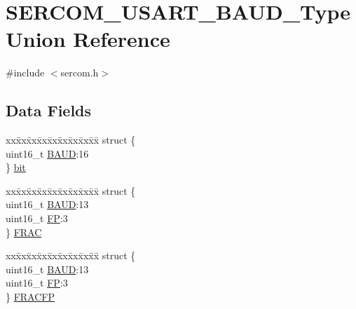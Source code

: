 \hypertarget{union_s_e_r_c_o_m___u_s_a_r_t___b_a_u_d___type}{}\section{S\+E\+R\+C\+O\+M\+\_\+\+U\+S\+A\+R\+T\+\_\+\+B\+A\+U\+D\+\_\+\+Type Union Reference}
\label{union_s_e_r_c_o_m___u_s_a_r_t___b_a_u_d___type}


{\ttfamily \#include $<$sercom.\+h$>$}

\subsection*{Data Fields}
\begin{DoxyCompactItemize}
\item 
\begin{tabbing}
xx\=xx\=xx\=xx\=xx\=xx\=xx\=xx\=xx\=\kill
struct \{\\
\>uint16\_t \mbox{\hyperlink{union_s_e_r_c_o_m___u_s_a_r_t___b_a_u_d___type_a4e98caf098e8b0e2afbb35aa81e03f6a}{BAUD}}:16\\
\} \mbox{\hyperlink{union_s_e_r_c_o_m___u_s_a_r_t___b_a_u_d___type_a70d99152e7a87b212ff5f67996ab0d4c}{bit}}\\

\end{tabbing}\item 
\begin{tabbing}
xx\=xx\=xx\=xx\=xx\=xx\=xx\=xx\=xx\=\kill
struct \{\\
\>uint16\_t \mbox{\hyperlink{union_s_e_r_c_o_m___u_s_a_r_t___b_a_u_d___type_a4e98caf098e8b0e2afbb35aa81e03f6a}{BAUD}}:13\\
\>uint16\_t \mbox{\hyperlink{union_s_e_r_c_o_m___u_s_a_r_t___b_a_u_d___type_afc8e941969959ac8ef02b02dbc50c9a7}{FP}}:3\\
\} \mbox{\hyperlink{union_s_e_r_c_o_m___u_s_a_r_t___b_a_u_d___type_ae69f71281b7fa2be7141557d2619fb1d}{FRAC}}\\

\end{tabbing}\item 
\begin{tabbing}
xx\=xx\=xx\=xx\=xx\=xx\=xx\=xx\=xx\=\kill
struct \{\\
\>uint16\_t \mbox{\hyperlink{union_s_e_r_c_o_m___u_s_a_r_t___b_a_u_d___type_a4e98caf098e8b0e2afbb35aa81e03f6a}{BAUD}}:13\\
\>uint16\_t \mbox{\hyperlink{union_s_e_r_c_o_m___u_s_a_r_t___b_a_u_d___type_afc8e941969959ac8ef02b02dbc50c9a7}{FP}}:3\\
\} \mbox{\hyperlink{union_s_e_r_c_o_m___u_s_a_r_t___b_a_u_d___type_a250652f5b182c25ca7aa1ce0a83851ab}{FRACFP}}\\


\end{tabbing}
\end{DoxyCompactItemize}

